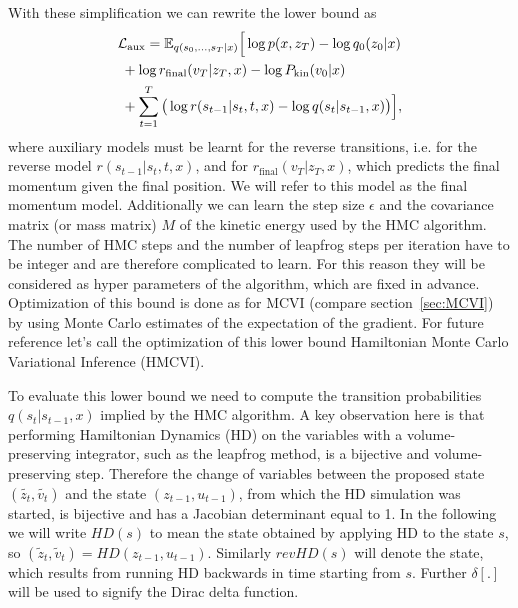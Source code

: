 With these simplification we can rewrite the lower bound as
\begin{equation} \label{eq:HMCVIAuxLowerBound}
\begin{split}
&\mathcal{L_\textrm{aux}} = \mathbb{E}_{q(s_0, \ldots, s_T|x)} \Big[ \log p(x, z_T) - \log q_0(z_0|x) \\
&\;+ \log r_{\textrm{final}}(v_T | z_T, x) - \log P_\textrm{kin}(v_0|x)  \\ 
&\;+ \sum \limits_{t=1}^T \big( \log r(s_{t-1}|s_t, t, x) - \log q(s_t|s_{t-1}, x) \big) \Big],
\end{split}
\end{equation}
where auxiliary models must be learnt for the reverse transitions, i.e. for the reverse model $r(s_{t-1}|s_t, t, x)$, and for $r_{\textrm{final}}(v_T | z_T, x)$, which predicts the final momentum given the final position. We will refer to this model as the final momentum model. Additionally we can learn the step size $\epsilon$ and the covariance matrix (or mass matrix) $M$ of the kinetic energy used by the HMC algorithm. The number of HMC steps and the number of leapfrog steps per iteration have to be integer and are therefore complicated to learn. For this reason they will be considered as hyper parameters of the algorithm, which are fixed in advance. Optimization of this bound is done as for MCVI (compare section~\ref{sec:MCVI}) by using Monte Carlo estimates of the expectation of the gradient. For future reference let's call the optimization of this lower bound Hamiltonian Monte Carlo Variational Inference (HMCVI).

To evaluate this lower bound we need to compute the transition probabilities $q(s_t|s_{t-1}, x)$ implied by the HMC algorithm. A key observation here is that performing Hamiltonian Dynamics (HD) on the variables with a volume-preserving integrator, such as the leapfrog method, is a bijective and volume-preserving step. Therefore the change of variables between the proposed state $(\tilde{z_t}, \tilde{v_t})$ and the state $(z_{t-1}, u_{t-1})$, from which the HD simulation was started, is bijective and has a Jacobian determinant equal to 1. In the following we will write $HD(s)$ to mean the state obtained by applying HD to the state $s$, so $(\tilde{z}_t, \tilde{v}_t) = HD(z_{t-1}, u_{t-1})$. Similarly $revHD(s)$ will denote the state, which results from running HD backwards in time starting from $s$. Further $\delta[.]$ will be used to signify the Dirac delta function.

